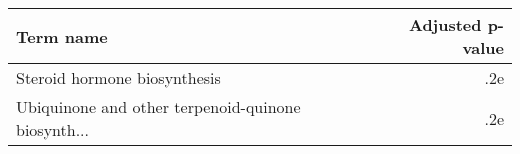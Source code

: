 \begin{tabular}{lr}
\toprule
                                         Term name &  Adjusted p-value \\
\midrule
                      Steroid hormone biosynthesis &               .2e \\
Ubiquinone and other terpenoid-quinone biosynth... &               .2e \\
\bottomrule
\end{tabular}
